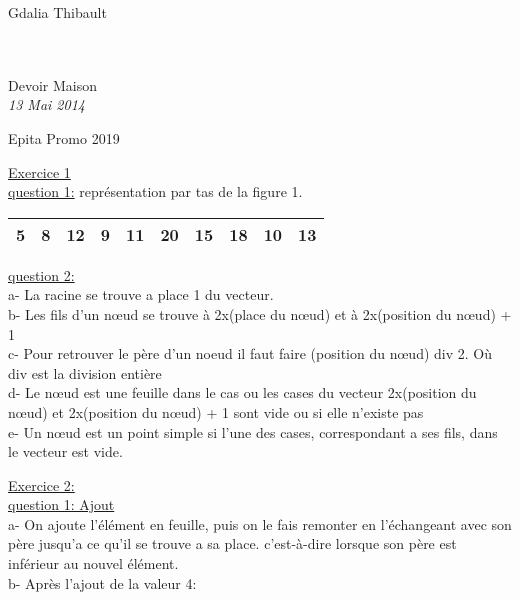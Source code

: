 \documentclass [11pt]{report}
\begin{document}
{\huge Gdalia Thibault}\\
\\
\vspace{20mm}\\
\begin{center}
{\Huge Devoir Maison}\\ {\LARGE \textit{13 Mai 2014}}\\
\end{center}
\vspace{110mm}
\begin{flushright}
Epita Promo 2019\\
\end{flushright}
\newpage
\underline{{\huge Exercice 1}}\\
\indent \underline{question 1:} \vspace{2.5mm}
	 repr\'esentation par tas de la figure 1.\\
\begin{tabular}{|c|c|c|c|c|c|c|c|c|c|}
\hline 5 & 8 & 12 & 9 & 11 & 20 & 15 & 18 & 10 & 13 \\ 
\hline 
\end{tabular} 

\vspace{5mm}

\indent \underline{question 2:}\\
a- La racine se trouve a place 1 du vecteur.\\
b- Les fils d'un nœud se trouve \`a 2x(place du nœud) et \`a 2x(position du nœud) + 1 \\
c- Pour retrouver le p\`ere d'un noeud il faut faire (position du nœud) div 2. O\`u div est la division enti\`ere\\
d- Le nœud est une feuille dans le cas ou les cases du vecteur 2x(position du nœud) et 2x(position du nœud) + 1 sont vide ou si elle n'existe pas\\
e- Un nœud est un point simple si l'une des cases, correspondant a ses fils, dans le vecteur est vide.\\

\vspace{10mm}

\underline{{\huge Exercice 2:}}\\
\indent \underline{question 1: Ajout}\\
\indent a- On ajoute l'\'el\'ement en feuille, puis on le fais remonter en l'\'echangeant avec son p\`ere jusqu'a ce qu'il se trouve a sa place. c'est-\`a-dire lorsque son p\`ere est inf\'erieur au nouvel \'el\'ement.\\
\indent b- Apr\`es l'ajout de la valeur 4:
\end{document}
